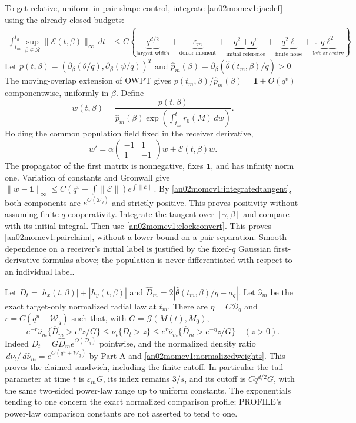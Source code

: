 \documentclass[11pt]{article}
\theoremstyle{remark}\newtheorem{remark}[theorem]{Remark}
\newcommand{\dd}{\,d}
\newcommand{\Rhalf}{\mathcal R}
\newcommand{\ones}{\boldsymbol1}
\newcommand{\eps}{\varepsilon}
\begin{document}
To get relative, uniform-in-pair shape control, integrate
\eqref{an02momcv1:jacdef} using the already closed budgets:
\begin{align}
 \int_{t_m}^{t_h}\sup_{\beta\in\Rhalf}\|\mathcal E(t,\beta)\|_\infty
 \dd t
 &\le C\left\{
 \underbrace{q^{d/2}}_{\text{largest width}}+
 \underbrace{\eps_m}_{\text{donor moment}}+
 \underbrace{q^2+q^v}_{\text{initial reference}}+
 \underbrace{q^2\ell}_{\text{finite noise}}+
 \underbrace{q\ell^2}_{\text{left ancestry}}\right\}.
 \label{an02momcv1:integratedtangent}
\end{align}
Let $p(t,\beta)=(\partial_\beta(\theta/q),
\partial_\beta(\psi/q))^T$ and
$\widehat p_m(\beta)=\partial_\beta(\widehat\theta(t_m,\beta)/q)>0$.
The moving-overlap extension of OWPT gives
$p(t_m,\beta)/\widehat p_m(\beta)=\ones+O(q^v)$
componentwise, uniformly in $\beta$.
Define
\[
 w(t,\beta)=
 \frac{p(t,\beta)}
 {\widehat p_m(\beta)\exp(\int_{t_m}^{t}r_0(M)\dd w)} .
\]
Holding the common population field fixed in the receiver derivative,
\begin{equation}\label{an02momcv1:normalizedtangent}
 w'=\alpha\begin{pmatrix}-1&1\\1&-1\end{pmatrix}w
       +\mathcal E(t,\beta)w .
\end{equation}
The propagator of the first matrix is nonnegative, fixes $\ones$,
and has infinity norm one. Variation of constants and Gronwall give
$\|w-\ones\|_\infty\le C(q^v+\int\|\mathcal E\|)e^{\int\|\mathcal E\|}$.
By \eqref{an02momcv1:integratedtangent}, both components are
$e^{O(\mathcal D_q)}$ and strictly positive.
This proves positivity without assuming finite-$q$ cooperativity.
Integrate the tangent over $[\gamma,\beta]$ and compare with its
initial integral. Then use \eqref{an02momcv1:clockconvert}.
This proves \eqref{an02momcv1:pairclaim}, without a lower bound
on a pair separation. Smooth dependence on a receiver's initial
label is justified by the fixed-$q$ Gaussian first-derivative
formulas above; the population is never differentiated with
respect to an individual label.

Let $D_t=|h_x(t,\beta)|+|h_y(t,\beta)|$ and
$\widehat D_m=2|\widehat\theta(t_m,\beta)/q-a_q|$.
Let $\widehat\nu_m$ be the exact target-only normalized radial law
at $t_m$. There are
$\eta=C\mathcal D_q$ and
$r=C(q^u+\mathcal W_q)$ such that, with $G=\mathcal G(M(t),M_0)$,
\begin{equation}\label{an02momcv1:tailsandwich}
 e^{-r}\widehat\nu_m\{\widehat D_m>e^\eta z/G\}
 \le\nu_t\{D_t>z\}
 \le e^r\widehat\nu_m\{\widehat D_m>e^{-\eta}z/G\}
 \quad(z>0).
\end{equation}
Indeed $D_t=G\widehat D_m e^{O(\mathcal D_q)}$ pointwise,
and the normalized density ratio
$\dd\nu_t/\dd\widehat\nu_m=e^{O(q^u+\mathcal W_q)}$
by Part A and \eqref{an02momcv1:normalizedweights}.
This proves the claimed sandwich, including the finite cutoff.
In particular the tail parameter at time $t$ is $\eps_m G$,
its index remains $3/s$, and its cutoff is $Cq^{d/2}G$,
with the same two-sided power-law range up to uniform constants.
The exponentials tending to one concern the exact normalized
comparison profile; PROFILE's power-law comparison constants
are not asserted to tend to one.
\end{document}
